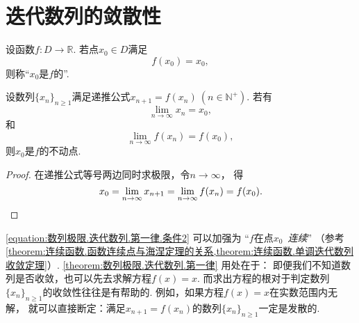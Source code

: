 \section{迭代数列的敛散性}
\begin{definition}\label{definition:迭代数列.不动点}
设函数\(f\colon D\to\mathbb{R}\).
若点\(x_0 \in D\)满足\[
	f(x_0) = x_0,
\]
则称“\(x_0\)是\(f\)的”.
\end{definition}
\begin{proposition}\label{theorem:数列极限.迭代数列.第一律}
设数列\(\{x_n\}_{n\geq1}\)满足递推公式\(x_{n+1} = f(x_n)\ (n\in\mathbb{N}^+)\).
若有\[%
	\lim_{n\to\infty} x_n = x_0,
\]和\begin{equation}\label{equation:数列极限.迭代数列.第一律.条件2}
	\lim_{n\to\infty} f(x_n) = f(x_0),
\end{equation}
则\(x_0\)是\(f\)的不动点.
\begin{proof}
在递推公式等号两边同时求极限，令\(n\to\infty\)，
得\[
	x_0 = \lim_{n\to\infty} x_{n+1} = \lim_{n\to\infty} f(x_n) = f(x_0).
	\qedhere
\]
\end{proof}
\end{proposition}
\begin{remark}
\cref{equation:数列极限.迭代数列.第一律.条件2} 可以加强为
“\(f\)在点\(x_0\)~\emph{连续}”
（参考\cref{theorem:连续函数.函数连续点与海涅定理的关系,theorem:连续函数.单调迭代数列收敛定理}）.
\cref{theorem:数列极限.迭代数列.第一律} 用处在于：
即便我们不知道数列是否收敛，也可以先去求解方程\(f(x) = x\).
而求出方程的根对于判定数列\(\{x_n\}_{n\geq1}\)的收敛性往往是有帮助的.
例如，如果方程\(f(x) = x\)在实数范围内无解，
就可以直接断定：满足\(x_{n+1} = f(x_n)\)的数列\(\{x_n\}_{n\geq1}\)一定是发散的.
\end{remark}
